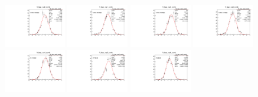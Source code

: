 \begin{figure}[h]\centering
    \includegraphics[width=0.24\textwidth]{figure/io_wo_bkg/fitfrac/pull_fitfrac_res0_comb.pdf}
    \includegraphics[width=0.24\textwidth]{figure/io_wo_bkg/fitfrac/pull_fitfrac_res1_comb.pdf}
    \includegraphics[width=0.24\textwidth]{figure/io_wo_bkg/fitfrac/pull_fitfrac_res2_comb.pdf}
    \includegraphics[width=0.24\textwidth]{figure/io_wo_bkg/fitfrac/pull_fitfrac_res3_comb.pdf}
    \includegraphics[width=0.24\textwidth]{figure/io_wo_bkg/fitfrac/pull_fitfrac_res4_comb.pdf}
    \includegraphics[width=0.24\textwidth]{figure/io_wo_bkg/fitfrac/pull_fitfrac_res5_comb.pdf}
    \includegraphics[width=0.24\textwidth]{figure/io_wo_bkg/fitfrac/pull_fitfrac_res6_comb.pdf}

\end{figure}
